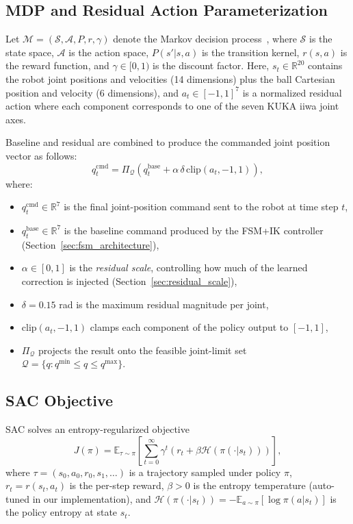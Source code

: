 \documentclass[10pt,twocolumn,letterpaper]{article}
\begin{document}
\subsection{MDP and Residual Action Parameterization}
Let $\mathcal{M}=(\mathcal{S},\mathcal{A},P,r,\gamma)$ denote the Markov decision process~\cite{sutton2018rl}, where $\mathcal{S}$ is the state space, $\mathcal{A}$ is the action space, $P(s'|s,a)$ is the transition kernel, $r(s,a)$ is the reward function, and $\gamma \in [0,1)$ is the discount factor.
Here, $s_t\in\mathbb{R}^{20}$ contains the robot joint positions and velocities (14 dimensions) plus the ball Cartesian position and velocity (6 dimensions), and $a_t\in[-1,1]^7$ is a normalized residual action where each component corresponds to one of the seven KUKA iiwa joint axes.

Baseline and residual are combined to produce the commanded joint position vector as follows:
\[
q_t^{\mathrm{cmd}}
=\Pi_{\mathcal{Q}}\!\left(q_t^{\mathrm{base}}+\alpha\,\delta\,\mathrm{clip}(a_t,-1,1)\right),
\]
where:
\begin{itemize}[leftmargin=*,noitemsep]
    \item $q_t^{\mathrm{cmd}} \in \mathbb{R}^7$ is the final joint-position command sent to the robot at time step $t$,
    \item $q_t^{\mathrm{base}} \in \mathbb{R}^7$ is the baseline command produced by the FSM+IK controller (Section~\ref{sec:fsm_architecture}),
    \item $\alpha \in [0,1]$ is the \emph{residual scale}, controlling how much of the learned correction is injected (Section~\ref{sec:residual_scale}),
    \item $\delta = 0.15$ rad is the maximum residual magnitude per joint,
    \item $\mathrm{clip}(a_t,-1,1)$ clamps each component of the policy output to $[-1,1]$,
    \item $\Pi_{\mathcal{Q}}$ projects the result onto the feasible joint-limit set $\mathcal{Q} = \{q : q^{\min} \le q \le q^{\max}\}$.
\end{itemize}

\subsection{SAC Objective}
SAC solves an entropy-regularized objective
\[
J(\pi)=\mathbb{E}_{\tau\sim\pi}\left[\sum_{t=0}^{\infty}\gamma^t\left(r_t+\beta\mathcal{H}(\pi(\cdot|s_t))\right)\right],
\]
where $\tau = (s_0,a_0,r_0,s_1,\ldots)$ is a trajectory sampled under policy $\pi$, $r_t = r(s_t,a_t)$ is the per-step reward, $\beta > 0$ is the entropy temperature (auto-tuned in our implementation), and $\mathcal{H}(\pi(\cdot|s_t)) = -\mathbb{E}_{a \sim \pi}[\log \pi(a|s_t)]$ is the policy entropy at state $s_t$.
\end{document}
